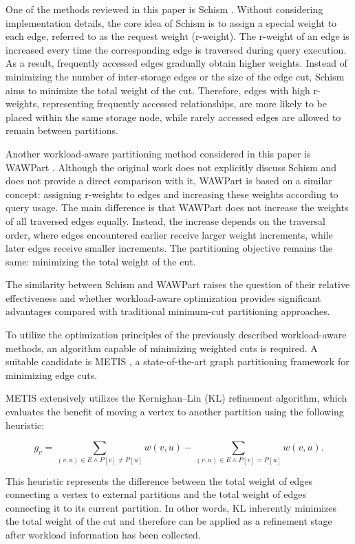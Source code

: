 One of the methods reviewed in this paper is Schism \cite{schism}. Without considering implementation details, the core idea of Schism is to assign a special weight to each edge, referred to as the request weight (r-weight). The r-weight of an edge is increased every time the corresponding edge is traversed during query execution. As a result, frequently accessed edges gradually obtain higher weights. Instead of minimizing the number of inter-storage edges or the size of the edge cut, Schism aims to minimize the total weight of the cut. Therefore, edges with high r-weights, representing frequently accessed relationships, are more likely to be placed within the same storage node, while rarely accessed edges are allowed to remain between partitions.

Another workload-aware partitioning method considered in this paper is WAWPart \cite{wawpart}. Although the original work does not explicitly discuss Schism and does not provide a direct comparison with it, WAWPart is based on a similar concept: assigning r-weights to edges and increasing these weights according to query usage. The main difference is that WAWPart does not increase the weights of all traversed edges equally. Instead, the increase depends on the traversal order, where edges encountered earlier receive larger weight increments, while later edges receive smaller increments. The partitioning objective remains the same: minimizing the total weight of the cut.

The similarity between Schism and WAWPart raises the question of their relative effectiveness and whether workload-aware optimization provides significant advantages compared with traditional minimum-cut partitioning approaches.

To utilize the optimization principles of the previously described workload-aware methods, an algorithm capable of minimizing weighted cuts is required. A suitable candidate is METIS \cite{MetisOG}, a state-of-the-art graph partitioning framework for minimizing edge cuts.

METIS extensively utilizes the Kernighan--Lin (KL) refinement algorithm, which evaluates the benefit of moving a vertex to another partition using the following heuristic:

\begin{equation*}
g_v = \sum_{(v,u) \in E \wedge P[v] \neq P[u]} w(v,u) - \sum_{(v,u) \in E \wedge P[v] = P[u]} w(v,u).
\end{equation*}

This heuristic represents the difference between the total weight of edges connecting a vertex to external partitions and the total weight of edges connecting it to its current partition. In other words, KL inherently minimizes the total weight of the cut and therefore can be applied as a refinement stage after workload information has been collected.

